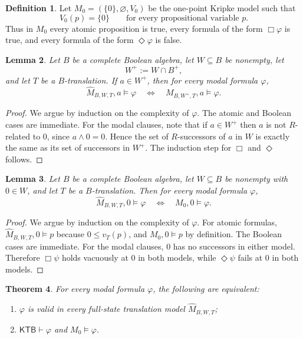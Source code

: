\documentclass[11pt]{amsart}
\theoremstyle{definition}
\newtheorem{definition}{Definition}[section]
\theoremstyle{plain}
\newtheorem{theorem}[definition]{Theorem}
\newtheorem{lemma}[definition]{Lemma}
\begin{document}
\begin{definition}\label{def:M0}
Let $M_0=(\{0\},\varnothing,V_0)$ be the one-point Kripke model such that
\[
V_0(p)=\{0\}
\qquad\text{for every propositional variable }p.
\]
Thus in $M_0$ every atomic proposition is true, every formula of the form $\Box\varphi$ is true,
and every formula of the form $\Diamond\varphi$ is false.
\end{definition}

\begin{lemma}\label{lem:nonzero-part-same}
Let $B$ be a complete Boolean algebra, let $W\subseteq B$ be nonempty, let
\[
W^+:=W\cap B^+,
\]
and let $T$ be a $B$-translation. If $a\in W^+$, then for every modal formula $\varphi$,
\[
\widehat M_{B,W,T},a\models \varphi
\quad\Longleftrightarrow\quad
M_{B,W^+,T},a\models \varphi.
\]
\end{lemma}

\begin{proof}
We argue by induction on the complexity of $\varphi$.
The atomic and Boolean cases are immediate.
For the modal clauses, note that if $a\in W^+$ then $a$ is not $R$-related to $0$, since $a\wedge 0=0$.
Hence the set of $R$-successors of $a$ in $W$ is exactly the same as its set of successors in $W^+$.
The induction step for $\Box$ and $\Diamond$ follows.
\end{proof}

\begin{lemma}\label{lem:zero-theory-fixed}
Let $B$ be a complete Boolean algebra, let $W\subseteq B$ be nonempty with $0\in W$, and let $T$
be a $B$-translation. Then for every modal formula $\varphi$,
\[
\widehat M_{B,W,T},0\models \varphi
\quad\Longleftrightarrow\quad
M_0,0\models \varphi.
\]
\end{lemma}

\begin{proof}
We argue by induction on the complexity of $\varphi$.
For atomic formulas, $\widehat M_{B,W,T},0\models p$ because $0\leq v_T(p)$, and
$M_0,0\models p$ by definition.
The Boolean cases are immediate.
For the modal clauses, $0$ has no successors in either model.
Therefore $\Box\psi$ holds vacuously at $0$ in both models, while $\Diamond\psi$ fails at $0$
in both models.
\end{proof}

\begin{theorem}\label{thm:full-state-characterization}
For every modal formula $\varphi$, the following are equivalent:
\begin{enumerate}[label=(\roman*)]
\item $\varphi$ is valid in every full-state translation model $\widehat M_{B,W,T}$;
\item $\mathsf{KTB}\vdash \varphi$ and $M_0\models \varphi$.
\end{enumerate}
\end{theorem}
\end{document}
